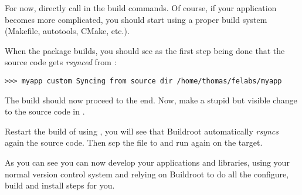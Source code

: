 For now, directly call  in the build commands. Of course, if
your application becomes more complicated, you should start using a
proper build system (Makefile, autotools, CMake, etc.).

When the package builds, you should see as the first step being done
that the  source code gets {\em rsynced} from
:

\begin{verbatim}
>>> myapp custom Syncing from source dir /home/thomas/felabs/myapp
\end{verbatim}

The build should now proceed to the end. Now, make a stupid but
visible change to the source code in .

Restart the build of  using , you
will see that Buildroot automatically {\em rsyncs} again the source
code. Then scp the file  to
 and run  again on the target.

As you can see you can now develop your applications and libraries,
using your normal version control system and relying on Buildroot to
do all the configure, build and install steps for you.
